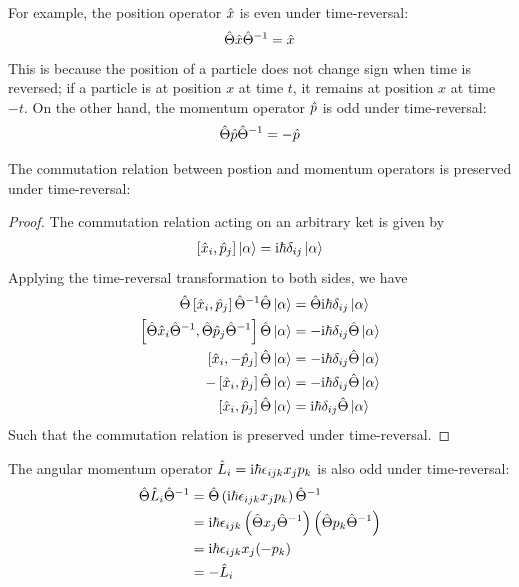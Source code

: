 For example, the position operator $\hat{x}$ is even under time-reversal:
\begin{align}
    \hat{\Theta} \hat{x} \hat{\Theta}^{-1} = \hat{x} \label{eq:position_time_reversal}
\end{align}
This is because the position of a particle does not change sign when time is reversed; if a particle is at position $x$ at time $t$, it remains at position $x$ at time $-t$.
On the other hand, the momentum operator $\hat{p}$ is odd under time-reversal:
\begin{align}
    \hat{\Theta} \hat{p} \hat{\Theta}^{-1} = - \hat{p} \label{eq:momentum_time_reversal}
\end{align}

The commutation relation between postion and momentum operators is preserved under time-reversal:
\begin{proof}
    The commutation relation acting on an arbitrary ket is given by 
    \begin{align*}
        \left[ \hat{x}_i , \hat{p}_j \right] \ket{\alpha} = \mathrm{i} \hbar \delta_{ij} \ket{\alpha}
    \end{align*}
    Applying the time-reversal transformation to both sides, we have 
    \begin{align*}
        \hat{\Theta} \left[ \hat{x}_i , \hat{p}_j \right] \hat{\Theta}^{-1} \hat{\Theta} \ket{\alpha} &=  \hat{\Theta} \mathrm{i} \hbar \delta_{ij} \ket{\alpha} \notag \\
        \left[ \hat{\Theta} \hat{x}_i \hat{\Theta}^{-1} , \hat{\Theta} \hat{p}_j \hat{\Theta}^{-1} \right] \hat{\Theta} \ket{\alpha} &= - \mathrm{i} \hbar \delta_{ij} \hat{\Theta} \ket{\alpha} \notag \\
        \left[ \hat{x}_i , - \hat{p}_j \right] \hat{\Theta} \ket{\alpha} &= - \mathrm{i} \hbar \delta_{ij} \hat{\Theta} \ket{\alpha} \notag \\
        - \left[ \hat{x}_i , \hat{p}_j \right] \hat{\Theta} \ket{\alpha} &= - \mathrm{i} \hbar \delta_{ij} \hat{\Theta} \ket{\alpha} \notag \\
        \left[ \hat{x}_i , \hat{p}_j \right] \hat{\Theta} \ket{\alpha} &= \mathrm{i} \hbar \delta_{ij} \hat{\Theta} \ket{\alpha}
    \end{align*}
    Such that the commutation relation is preserved under time-reversal.
\end{proof}

The angular momentum operator $\hat{L}_i = \mathrm{i} \hbar \epsilon_{ijk} x_j p_k $ is also odd under time-reversal: 
\begin{align}
    \hat{\Theta} \hat{L}_i \hat{\Theta}^{-1} &= \hat{\Theta} \left( \mathrm{i} \hbar \epsilon_{ijk} x_j p_k \right) \hat{\Theta}^{-1} \notag \\
    &= \mathrm{i} \hbar \epsilon_{ijk} \left( \hat{\Theta} x_j \hat{\Theta}^{-1} \right) \left( \hat{\Theta} p_k \hat{\Theta}^{-1} \right) \notag \\
    &= \mathrm{i} \hbar \epsilon_{ijk} x_j (- p_k) \notag \\
    &= - \hat{L}_i \label{eq:angular_momentum_time_reversal}
\end{align}

